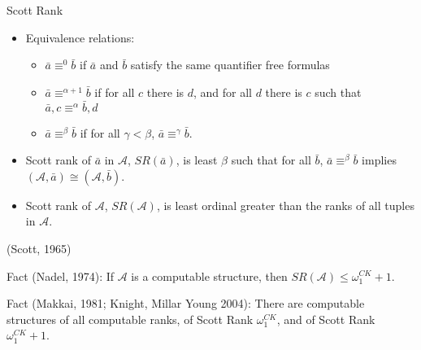 \documentclass[style=fyma
 ]{powerdot}
\begin{document}
\begin{slide}{Scott Rank}
  \begin{itemize}
    \item Equivalence relations: 
      \begin{itemize}
        \item $\bar{a} \equiv^{0} \bar{b}$ if $\bar{a}$ and $\bar{b}$ satisfy the same quantifier free formulas 
	\item $\bar{a} \equiv^{\alpha+1} \bar{b}$ if for all $c$ there is $d$, and for all $d$ there is $c$ such that $\bar{a},c \equiv^{\alpha} \bar{b},d$
	\item $\bar{a} \equiv^{\beta} \bar{b}$ if for all $\gamma < \beta$, $\bar{a} \equiv^{\gamma} \bar{b}$.
      \end{itemize}
    \item Scott rank of $\bar{a}$ in $\mathcal{A}$, $SR( \bar{a})$, is least $\beta$ such that for all $\bar{b}$, $\bar{a} \equiv^{\beta} \bar{b}$ implies $(\mathcal{A}, \bar{a}) \cong (\mathcal{A}, \bar{b})$.
    \item Scott rank of $\mathcal{A}$, $SR(\mathcal{A})$, is least ordinal greater than the ranks of all tuples in $\mathcal{A}$.
  \end{itemize}
\vspace{-10pt}
(Scott, 1965)


\pause \medskip

Fact (Nadel, 1974): If $\mathcal{A}$ is a computable structure, then $SR(\mathcal{A}) \leq \omega_{1}^{CK} + 1$. 

\medskip

Fact (Makkai, 1981; Knight, Millar Young 2004): There are computable structures of all computable ranks, of Scott Rank $\omega_1^{CK}$, and of Scott Rank $\omega_{1}^{CK} + 1$.

\end{slide}
\end{document}
